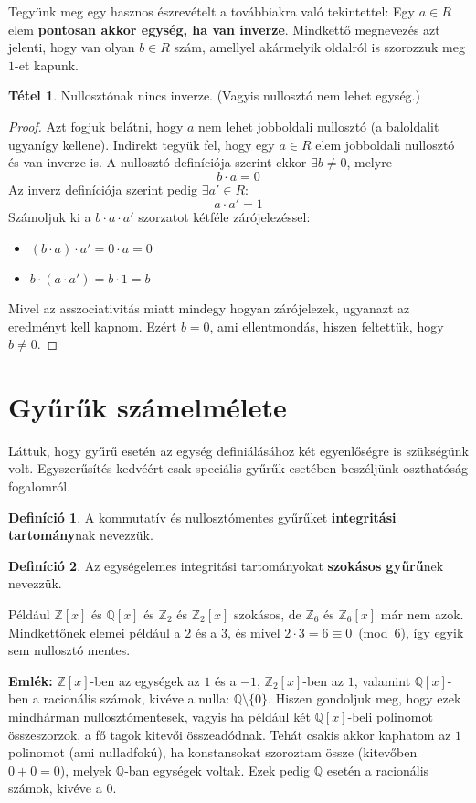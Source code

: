 \documentclass[12pt]{book}
\theoremstyle{plain} %
\theoremstyle{definition} %
\newtheorem{defi/}{Definíció}[section]
\newenvironment{defi}
  {\renewcommand{\qedsymbol}{$\clubsuit$}%
   \pushQED{\qed}\begin{defi/}}
  {\popQED\end{defi/}}
\newtheorem{theo/}{Tétel}[section]
\newenvironment{theo}
  {\renewcommand{\qedsymbol}{$\clubsuit$}%
   \pushQED{\qed}\begin{theo/}}
  {\popQED\end{theo/}}
\theoremstyle{remark}
\renewcommand\qedsymbol{$\blacksquare$}
\numberwithin{equation}{section}  %
\begin{document}
	Tegyünk meg egy hasznos észrevételt a továbbiakra való tekintettel: Egy $a\in R$ elem \textbf{pontosan akkor egység, ha van inverze}. Mindkettő megnevezés azt jelenti, hogy van olyan $b\in R$ szám, amellyel akármelyik oldalról is szorozzuk meg $1$-et kapunk.
	\begin{theo}
		Nullosztónak nincs inverze. (Vagyis nullosztó nem lehet egység.)
	\end{theo}
	\begin{proof}
		Azt fogjuk belátni, hogy $a$ nem lehet jobboldali nullosztó (a baloldalit ugyanígy kellene). Indirekt tegyük fel, hogy egy $a\in R$ elem jobboldali nullosztó és van inverze is. A nullosztó definíciója szerint ekkor $\exists b\neq 0$, melyre
		\[ b\cdot a = 0 \]
		Az inverz definíciója szerint pedig $\exists a'\in R\colon$
		\[ a\cdot a' = 1 \]
		Számoljuk ki a $b\cdot a \cdot a'$ szorzatot kétféle zárójelezéssel:
		\begin{itemize}
			\item $(b\cdot a) \cdot a' = 0\cdot a = 0$
			\item $b\cdot (a\cdot a') = b\cdot 1 = b$
		\end{itemize}
		Mivel az asszociativitás miatt mindegy hogyan zárójelezek, ugyanazt az eredményt kell kapnom. Ezért $b=0$, ami ellentmondás, hiszen feltettük, hogy $b\neq 0$.
	\end{proof}
	
	\section{Gyűrűk számelmélete}
	Láttuk, hogy gyűrű esetén az egység definiálásához két egyenlőségre is szükségünk volt. Egyszerűsítés kedvéért csak speciális gyűrűk esetében beszéljünk oszthatóság fogalomról.
	\begin{defi}
		A kommutatív és nullosztómentes gyűrűket \textbf{integritási tartomány}nak nevezzük.
	\end{defi}
	\begin{defi}
		Az egységelemes integritási tartományokat \textbf{szokásos gyűrű}nek nevezzük.
	\end{defi}
	Például $\mathbb{Z}[x]$ és $\mathbb{Q}[x]$ és $\mathbb{Z}_2$ és $\mathbb{Z}_2[x]$ szokásos, de $\mathbb{Z}_6$ és $\mathbb{Z}_6[x]$ már nem azok. Mindkettőnek elemei például a $2$ és a $3$, és mivel $2\cdot 3 = 6 \equiv 0$~(mod~6), így egyik sem nullosztó mentes.
	
	\textbf{Emlék: }$\mathbb{Z}[x]$-ben az egységek az $1$ és a $-1$, $\mathbb{Z}_2[x]$-ben az $1$, valamint $\mathbb{Q}[x]$-ben a racionális számok, kivéve a nulla: $\mathbb{Q}\setminus \{0\}$. Hiszen gondoljuk meg, hogy ezek mindhárman nullosztómentesek, vagyis ha például két $\mathbb{Q}[x]$-beli polinomot összeszorzok, a fő tagok kitevői összeadódnak. Tehát csakis akkor kaphatom az $1$ polinomot (ami nulladfokú), ha konstansokat szoroztam össze (kitevőben $0+0=0$), melyek $\mathbb{Q}$-ban egységek voltak. Ezek pedig $\mathbb{Q}$ esetén a racionális számok, kivéve a $0$.
	
\end{document}
